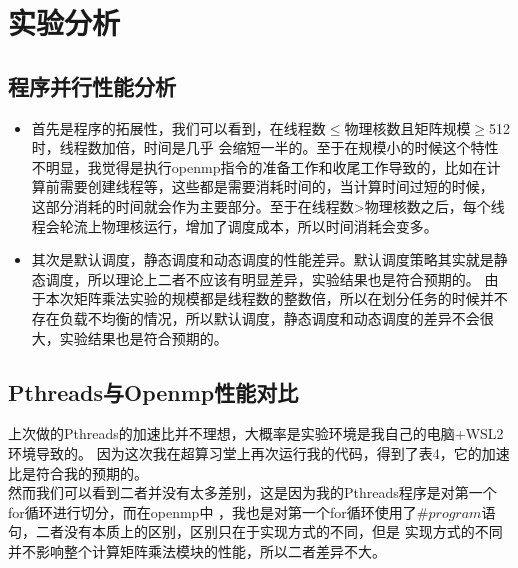 \documentclass{SYSUReport}
\begin{document}
\section{实验分析}
\subsection{程序并行性能分析}
\begin{itemize}
    \item 首先是程序的拓展性，我们可以看到，在线程数$\le$物理核数且矩阵规模$\ge$512时，线程数加倍，时间是几乎
    会缩短一半的。至于在规模小的时候这个特性不明显，我觉得是执行openmp指令的准备工作和收尾工作导致的，比如在计算前需要创建线程等，这些都是需要消耗时间的，当计算时间过短的时候，
    这部分消耗的时间就会作为主要部分。至于在线程数>物理核数之后，每个线程会轮流上物理核运行，增加了调度成本，所以时间消耗会变多。
    \item 其次是默认调度，静态调度和动态调度的性能差异。默认调度策略其实就是静态调度，所以理论上二者不应该有明显差异，实验结果也是符合预期的。
    由于本次矩阵乘法实验的规模都是线程数的整数倍，所以在划分任务的时候并不存在负载不均衡的情况，所以默认调度，静态调度和动态调度的差异不会很大，实验结果也是符合预期的。
\end{itemize}
\subsection{Pthreads与Openmp性能对比}
上次做的Pthreads的加速比并不理想，大概率是实验环境是我自己的电脑+WSL2环境导致的。
因为这次我在超算习堂上再次运行我的代码，得到了表4，它的加速比是符合我的预期的。\\
然而我们可以看到二者并没有太多差别，这是因为我的Pthreads程序是对第一个for循环进行切分，而在openmp中
，我也是对第一个for循环使用了$\#program$语句，二者没有本质上的区别，区别只在于实现方式的不同，但是
实现方式的不同并不影响整个计算矩阵乘法模块的性能，所以二者差异不大。
\end{document}
